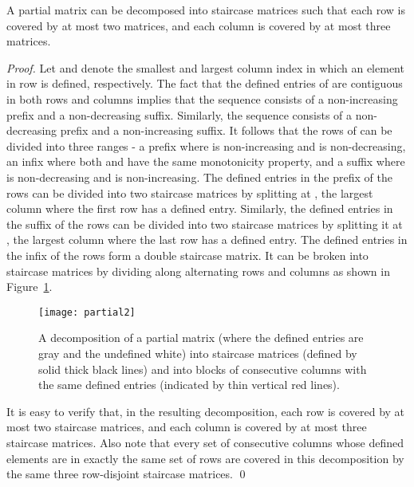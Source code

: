 \documentclass{llncs}
\begin{document}
\begin{lemma}\label{lemma:decomposition}
A partial matrix  can be decomposed into staircase
matrices  such that each row is covered by at most two matrices,
and each column is covered by at most three  matrices.
\end{lemma}
\begin{proof}

Let  and  denote the smallest and largest column index
in which an element in row  is defined, respectively. 
The fact that the defined entries of  are contiguous in both rows
and columns implies that the sequence  consists of a
non-increasing prefix and a non-decreasing suffix. Similarly, the 
sequence  consists of a
non-decreasing prefix and a non-increasing suffix. 
It follows that the rows of  can be divided into three ranges - 
a prefix where  is non-increasing and  is non-decreasing, an infix where
both  and  have the same monotonicity property, and a suffix
where  is non-decreasing and  is non-increasing.
The defined entries in the prefix of the rows can be divided into two
staircase matrices by splitting  at , the largest column where the
first row has a defined entry. 
Similarly, the defined entries in the suffix of the rows can be divided into two
staircase matrices by splitting it at , the largest column where the
last row has a defined entry. 
The defined entries in the infix of the rows form a double staircase
matrix. It can be broken into staircase matrices by dividing along
alternating rows and columns as shown in Figure~\ref{fig:partial}. 

\begin{figure}[h!]
\centering
   \texttt{[image: partial2]}
   \caption{
   A decomposition of a partial matrix (where the defined entries are gray and the undefined white) into staircase matrices
     (defined by solid thick black lines) and into blocks of consecutive
     columns with the same defined entries (indicated by thin vertical
     red lines).\label{fig:partial}}
 \end{figure}

It is easy to verify that, in the resulting decomposition, each row
is covered by at most two staircase matrices, and each column is covered
by at most three staircase matrices.
Also note that  every set of consecutive
columns whose defined elements are in exactly the same set of rows are covered
in this decomposition by the same three row-disjoint staircase matrices. \qed
\end{proof}
\end{document}
